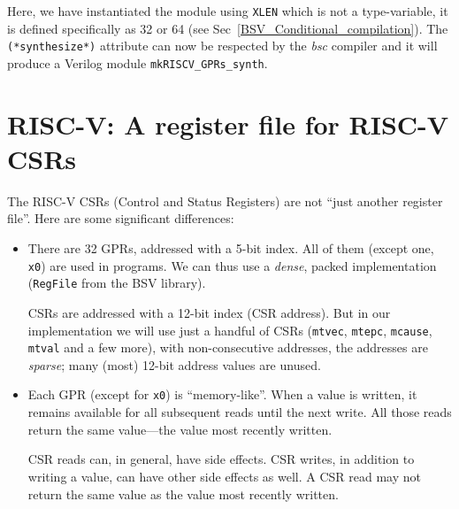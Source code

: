


Here, we have instantiated the module using \verb|XLEN| which is not a
type-variable, it is defined specifically as 32 or 64 (see
Sec~\ref{BSV_Conditional_compilation}).  The \verb|(*synthesize*)|
attribute can now be respected by the \emph{bsc} compiler and it will
produce a Verilog module \verb|mkRISCV_GPRs_synth|.


\section{RISC-V: A register file for RISC-V CSRs}

\label{Sec_RISCV_CSRs}

The RISC-V CSRs (Control and Status Registers) are not ``just another
register file''.  Here are some significant differences:

\begin{itemize}

 \item There are 32 GPRs, addressed with a 5-bit index.  All of them
       (except one, \verb|x0|) are used in programs.  We can thus use
       a \emph{dense}, packed implementation (\verb|RegFile| from the
       BSV library).

       CSRs are addressed with a 12-bit index (CSR address).  But in
       our implementation we will use just a handful of CSRs
       (\verb|mtvec|, \verb|mtepc|, \verb|mcause|, \verb|mtval| and a
       few more), with non-consecutive addresses, {\ie} the addresses
       are \emph{sparse}; many (most) 12-bit address values are
       unused.

 \item Each GPR (except for \verb|x0|) is ``memory-like''.  When a
       value is written, it remains available for all subsequent reads
       until the next write.  All those reads return the same
       value---the value most recently written.

       CSR reads can, in general, have side effects.  CSR writes, in
       addition to writing a value, can have other side effects as
       well.  A CSR read may not return the same value as the value
       most recently written.

\end{itemize}

